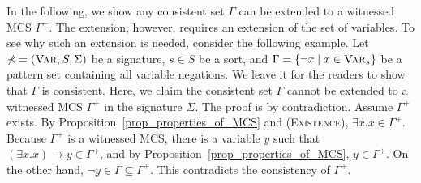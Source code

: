 \documentclass[acmsmall]{acmart}
\theoremstyle{acmdefinition}
\newcommand{\imp}{\to}
\newcommand{\Var}{\textnormal{\textsc{Var}}}
\newcommand{\sig}{\mathbb{\Sigma}}
\newcommand{\Pattern}{\textnormal{\textsc{Pattern}}}
\newcommand{\ePattern}{\Pattern^+}
\newcommand{\eGamma}{\Gamma^+}
\newcommand{\prule}[1]{\textsc{(#1)}}
\newcommand{\existence}{\prule{Existence}\xspace}
\begin{document}
\begin{comment}
The above results show that the nominal extension $\ePattern$
still enjoys expected properties,
even though it
is a restriction of the extended language $\ePattern$ by excluding all patterns
where nominal variables are quantified.
From now on till the end of this section,
let us only consider the nominal extension language $\ePattern$.
We will use $\Gamma, \Delta, \Sigma$ to denote witnessed MCSs
in $\ePattern$ unless we explicitly say otherwise.
We also write $\vdash \varphi$ to denote that $\varphi$ is derivable in 
$\ePattern$, unless we say otherwise.

\end{comment}


In the following, we show any consistent set
$\Gamma$ can be extended to a witnessed MCS
$\eGamma$.
The extension, however, requires an extension
of the set of variables.
To see why such an extension is needed, consider
the following example.
Let $\sig = (\Var, S, \Sigma)$ be a signature,
$s \in S$ be a sort,
and 
$\Gamma = \{ \neg x \mid x \in \Var_s \}$
be a pattern set containing all variable negations.
We leave it for the readers to show that $\Gamma$ is consistent.
Here, we claim the consistent set $\Gamma$
cannot be extended to a witnessed MCS $\eGamma$ in the signature $\sig$.
The proof is by contradiction.
Assume $\eGamma$ exists.
By Proposition~\ref{prop_properties_of_MCS} and \existence,
$\exists x . x \in \eGamma$.
Because $\eGamma$ is a witnessed MCS,
there is a variable $y$ such that
$(\exists x . x) \imp y \in \eGamma$, and
by Proposition~\ref{prop_properties_of_MCS}, $y \in \eGamma$.
On the other hand, $\neg y \in \Gamma \subseteq \eGamma$.
This contradicts the consistency of $\eGamma$.
\end{document}
